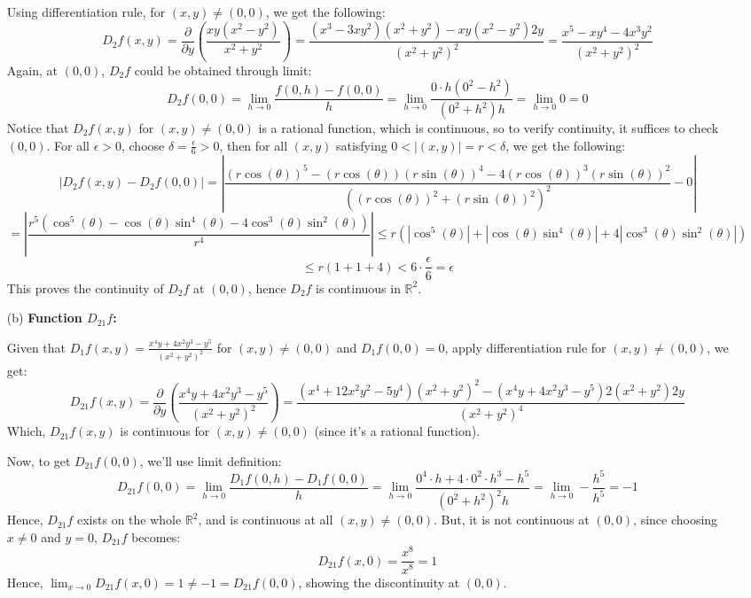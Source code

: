 \documentclass{article}
\begin{document}
\begin{itemize}
    Using differentiation rule, for $(x,y)\neq (0,0)$, we get the following:
    $$D_2f(x,y)=\frac{\partial}{\partial y}\left(\frac{xy(x^2-y^2)}{x^2+y^2}\right) = \frac{(x^3-3xy^2)(x^2+y^2)-xy(x^2-y^2)2y}{(x^2+y^2)^2} = \frac{x^5-xy^4-4x^3y^2}{(x^2+y^2)^2}$$
    Again, at $(0,0)$, $D_2f$ could be obtained through limit:
    $$D_2f(0,0)=\lim_{h\rightarrow 0}\frac{f(0,h)-f(0,0)}{h} = \lim_{h\rightarrow 0}\frac{0\cdot h(0^2-h^2)}{(0^2+h^2)h} = \lim_{h\rightarrow 0}0=0$$
    Notice that $D_2f(x,y)$ for $(x,y)\neq (0,0)$ is a rational function, which is continuous, so to verify continuity, it suffices to check $(0,0)$. For all $\epsilon>0$, choose $\delta=\frac{\epsilon}{6}>0$, then for all $(x,y)$ satisfying $0<|(x,y)|=r<\delta$, we get the following:
    $$|D_2f(x,y)-D_2f(0,0)|=\left|\frac{(r\cos(\theta))^5-(r\cos(\theta))(r\sin(\theta))^4-4(r\cos(\theta))^3(r\sin(\theta))^2}{((r\cos(\theta))^2+(r\sin(\theta))^2)^2}-0\right|$$
    $$= \left|\frac{r^5(\cos^5(\theta)-\cos(\theta)\sin^4(\theta)-4\cos^3(\theta)\sin^2(\theta))}{r^4}\right| \leq r(|\cos^5(\theta)|+|\cos(\theta)\sin^4(\theta)|+4|\cos^3(\theta)\sin^2(\theta)|)$$
    $$ \leq r(1+1+4) < 6\cdot \frac{\epsilon}{6} = \epsilon$$
    This proves the continuity of $D_2f$ at $(0,0)$, hence $D_2f$ is continuous in $\mathbb{R}^2$.

    \hfil

    \hfil

    \item[(b)] \textbf{Function $D_{21}f$:}
    
    Given that $D_1f(x,y)=\frac{x^4y+4x^2y^3-y^5}{(x^2+y^2)^2}$ for $(x,y)\neq (0,0)$ and $D_1f(0,0)=0$, apply differentiation rule for $(x,y)\neq (0,0)$, we get:
    $$D_{21}f(x,y) = \frac{\partial}{\partial y}\left(\frac{x^4y+4x^2y^3-y^5}{(x^2+y^2)^2}\right) = \frac{(x^4+12x^2y^2-5y^4)(x^2+y^2)^2-(x^4y+4x^2y^3-y^5)2(x^2+y^2)2y}{(x^2+y^2)^4}$$
    Which, $D_{21}f(x,y)$ is continuous for $(x,y)\neq (0,0)$ (since it's a rational function).

    Now, to get $D_{21}f(0,0)$, we'll use limit definition:
    $$D_{21}f(0,0)=\lim_{h\rightarrow 0}\frac{D_1f(0,h)-D_1f(0,0)}{h} = \lim_{h\rightarrow 0}\frac{0^4\cdot h + 4\cdot 0^2\cdot h^3-h^5}{(0^2+h^2)^2 h} = \lim_{h\rightarrow 0}-\frac{h^5}{h^5}=-1$$
    Hence, $D_{21}f$ exists on the whole $\mathbb{R}^2$, and is continuous at all $(x,y)\neq (0,0)$. But, it is not continuous at $(0,0)$, since choosing $x\neq 0$ and $y=0$, $D_{21}f$ becomes:
    $$D_{21}f(x,0)=\frac{x^8}{x^8} = 1$$
    Hence, $\lim_{x\rightarrow 0}D_{21}f(x,0)=1\neq -1 = D_{21}f(0,0)$, showing the discontinuity at $(0,0)$.


\end{itemize}
\end{document}
